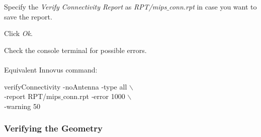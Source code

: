 \begin{enumerate}
{	\item Specify the \textit{Verify Connectivity Report} as \textit{RPT/mips$\_$conn.rpt} in case you want to save the report.
	\item Click \textit{Ok}.
	\item Check the console terminal for possible errors. \\ \\
	Equivalent Innovus command:
	\begin{codeline}
		verifyConnectivity -noAntenna ‐type all $\backslash$ \\ ‐report RPT/mips$\_$conn.rpt
		‐error 1000 $\backslash$ \\ ‐warning 50
	\end{codeline}


} 

\end{enumerate}	

		\vspace{0mm}

\subsubsection{Verifying the Geometry}

